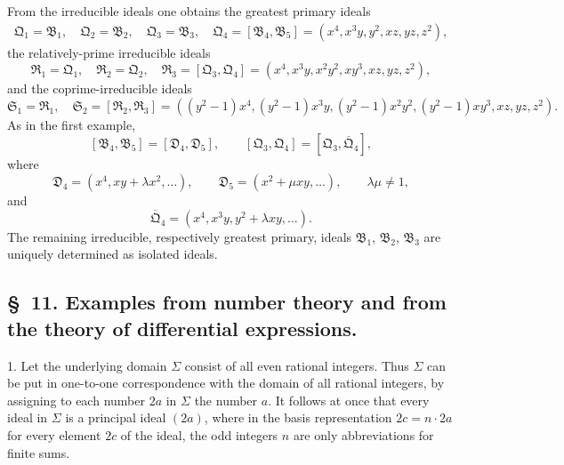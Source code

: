 \documentclass[11pt]{article}
\newcommand{\ideal}[1]{\mathfrak{#1}}
\begin{document}
From the irreducible ideals one obtains the greatest primary ideals
\[
\begin{gathered}
 \ideal Q_1=\ideal B_1,
 \quad \ideal Q_2=\ideal B_2,
 \quad \ideal Q_3=\ideal B_3,
 \quad \ideal Q_4=[\ideal B_4,\ideal B_5]=(x^4,x^3y,y^2,xz,yz,z^2),
\end{gathered}
\]
the relatively-prime irreducible ideals
\[
 \ideal R_1=\ideal Q_1,
 \quad \ideal R_2=\ideal Q_2,
 \quad
 \ideal R_3=[\ideal Q_3,\ideal Q_4]=(x^4,x^3y,x^2y^2,xy^3,xz,yz,z^2),
\]
and the coprime-irreducible ideals
\[
 \ideal S_1=\ideal R_1,
 \quad \ideal S_2=[\ideal R_2,\ideal R_3]
 =((y^2-1)x^4,(y^2-1)x^3y,(y^2-1)x^2y^2,
 (y^2-1)xy^3,xz,yz,z^2).
\]
As in the first example,
\[
 [\ideal B_4,\ideal B_5]=[\ideal D_4,\ideal D_5],
 \qquad
 [\ideal Q_3,\ideal Q_4]=[\ideal Q_3,
\overline{\ideal Q}_4],
\]
where
\[
 \ideal D_4=(x^4,xy+\lambda x^2,\ldots),
 \qquad
 \ideal D_5=(x^2+\mu xy,\ldots),
 \qquad \lambda\mu\ne1,
\]
and
\[
 \overline{\ideal Q}_4=(x^4,x^3y,y^2+\lambda xy,\ldots).
\]
The remaining irreducible, respectively greatest primary, ideals $\ideal B_1$, $\ideal B_2$, $\ideal B_3$ are uniquely determined as isolated ideals.

\subsection*{\S~11. Examples from number theory and from the theory of differential expressions.}

1. Let the underlying domain $\Sigma$ consist of all even rational integers. Thus $\Sigma$ can be put in one-to-one correspondence with the domain of all rational integers, by assigning to each number $2a$ in $\Sigma$ the number $a$. It follows at once that every ideal in $\Sigma$ is a principal ideal $(2a)$, where in the basis representation $2c=n\cdot2a$ for every element $2c$ of the ideal, the odd integers $n$ are only abbreviations for finite sums.
\end{document}
